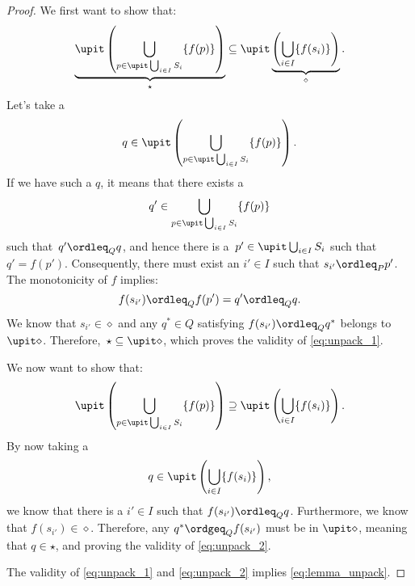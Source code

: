 \begin{proof}
  We first want to show that:
  \begin{equation}
    \label{eq:unpack_1}
    \underbrace{\upit \left(\bigcup_{p\in \upit \bigcup_{i\in I}S_i}\{f(p)\} \right)}_{\star}\subseteq \upit \underbrace{\left( \bigcup_{i\in I}\{f(s_i)\}\right)}_{\diamond}.
  \end{equation}
  Let's take a
  \begin{equation}
    q\in \upit\left( \bigcup_{p\in \upit \bigcup_{i\in I}S_i}\{f(p)\}\right).
  \end{equation}
  If we have such a $q$, it means that there exists a
  \begin{equation}
    q'\in \bigcup_{p\in \upit\bigcup_{i\in I}S_i}\{f(p)\}
  \end{equation}
  such that~$q'\ordleq_Q q$, and hence there is a~$p'\in \upit \bigcup_{i\in I} S_i$ such that $q'=f(p')$. Consequently, there must exist an $i'\in I$ such that $s_{i'}\ordleq_P p'$. The monotonicity of $f$ implies:
  \begin{equation}
    f(s_{i'})\ordleq_Q f(p')=q'\ordleq_Q q.
  \end{equation}
  We know that $s_{i'}\in \diamond$ and any $q^*\in Q$ satisfying $f(s_{i'})\ordleq_Q q^*$ belongs to $\upit \diamond$. Therefore,~$\star\subseteq \upit \diamond$, which proves the validity of \cref{eq:unpack_1}.

  We now want to show that:
  \begin{equation}
    \label{eq:unpack_2}
    \upit \left(\bigcup_{p\in \upit \bigcup_{i\in I}S_i}\{f(p)\} \right)\supseteq \upit \left( \bigcup_{i\in I}\{f(s_i)\}\right).
  \end{equation}
  By now taking a
  \begin{equation}
    q\in \upit \left( \bigcup_{i\in I}\{f(s_i)\}\right),
  \end{equation}
  we know that there is a $i'\in I$ such that $f(s_{i'})\ordleq_Q q$. Furthermore, we know that $f(s_{i'})\in \diamond$. Therefore, any $q^*\ordgeq_Q f(s_{i'})$ must be in $\upit \diamond$, meaning that $q\in \star$, and proving the validity of \cref{eq:unpack_2}.

  The validity of \cref{eq:unpack_1} and \cref{eq:unpack_2} implies \cref{eq:lemma_unpack}.
\end{proof}

